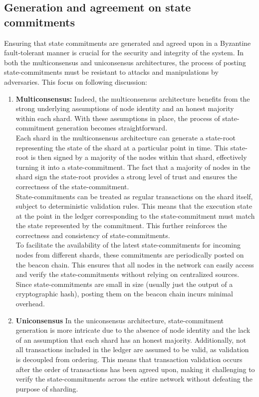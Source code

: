 \subsection{Generation and agreement on state commitments}
Ensuring that state commitments are generated and agreed upon in a Byzantine fault-tolerant manner is crucial for the security and integrity of the system. In both the multiconsensus and uniconsensus architectures, the process of posting state-commitments must be resistant to attacks and manipulations by adversaries. This focus on following discussion:
\begin{enumerate}
	\item \textbf{Multiconsensus:} Indeed, the multiconsensus architecture benefits from the strong underlying assumptions of node identity and an honest majority within each shard. With these assumptions in place, the process of state-commitment generation becomes straightforward.\\
	Each shard in the multiconsensus architecture can generate a state-root representing the state of the shard at a particular point in time. This state-root is then signed by a majority of the nodes within that shard, effectively turning it into a state-commitment. The fact that a majority of nodes in the shard sign the state-root provides a strong level of trust and ensures the correctness of the state-commitment.\\
	State-commitments can be treated as regular transactions on the shard itself, subject to deterministic validation rules. This means that the execution state at the point in the ledger corresponding to the state-commitment must match the state represented by the commitment. This further reinforces the correctness and consistency of state-commitments.\\
	To facilitate the availability of the latest state-commitments for incoming nodes from different shards, these commitments are periodically posted on the beacon chain. This ensures that all nodes in the network can easily access and verify the state-commitments without relying on centralized sources. Since state-commitments are small in size (usually just the output of a cryptographic hash), posting them on the beacon chain incurs minimal overhead.
	\item \textbf{Uniconsensus} In the uniconsensus architecture, state-commitment generation is more intricate due to the absence of node identity and the lack of an assumption that each shard has an honest majority. Additionally, not all transactions included in the ledger are assumed to be valid, as validation is decoupled from ordering. This means that transaction validation occurs after the order of transactions has been agreed upon, making it challenging to verify the state-commitments across the entire network without defeating the purpose of sharding.\\

\end{enumerate}
